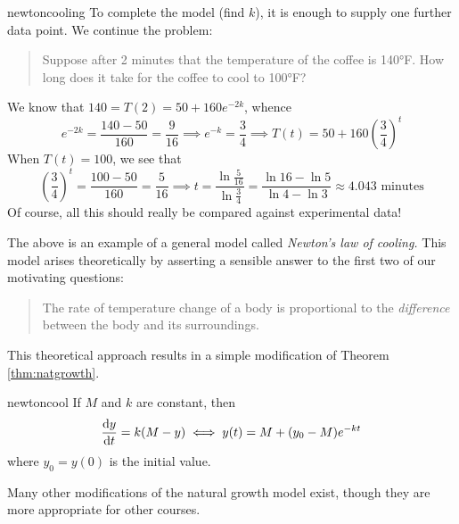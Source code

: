 \begin{example}{}{newtoncooling}
	To complete the model (find $k$), it is enough to supply one further data point. We continue the problem:
	\begin{quote}
		Suppose after 2 minutes that the temperature of the coffee is \ang{140}F. How long does it take for the coffee to cool to \ang{100}F?
	\end{quote}

	We know that $140=T(2)=50+160e^{-2k}$, whence
	\[
		e^{-2k}=\frac{140-50}{160}=\frac 9{16}\implies e^{-k}=\frac 34\implies T(t)=50+160\left(\frac 34\right)^t
	\]
	When $T(t)=100$, we see that
	\[
		\left(\frac 34\right)^t=\frac{100-50}{160}=\frac 5{16}\implies t=\frac{\ln\frac 5{16}}{\ln\frac 34} =\frac{\ln 16-\ln 5}{\ln 4-\ln 3}\approx 4.043\text{ minutes}
	\]
	Of course, all this should really be compared against experimental data!
\end{example}


The above is an example of a general model called \emph{Newton's law of cooling.} This model arises theoretically by asserting a sensible answer to the first two of our motivating questions:
\begin{quote}
	The rate of temperature change of a body is proportional to the \emph{difference} between the body and its surroundings.
\end{quote}

This theoretical approach results in a simple modification of Theorem \ref{thm:natgrowth}.

\begin{cor}{}{newtoncool}
	If $M$ and $k$ are constant, then
	\[
		\diff[y]{t}=k(M-y)\iff y(t)=M+(y_0-M)e^{-kt}
	\]
	where $y_0=y(0)$ is the initial value.
\end{cor}

Many other modifications of the natural growth model exist, though they are more appropriate for other courses.



